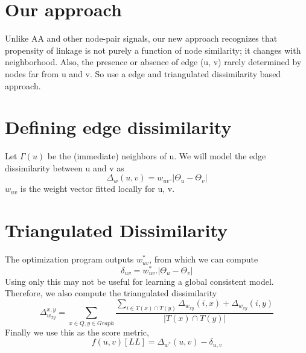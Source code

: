 \section*{Our approach}
Unlike AA and other node-pair signals, our new approach recognizes that propensity of linkage is not purely a function of node similarity; it changes with neighborhood. Also, the presence or absence of edge (u, v) rarely determined by nodes far from u and v. So use a edge and triangulated dissimilarity based approach.


\section*{Defining edge dissimilarity}
Let $\Gamma(u)$ be the (immediate) neighbors of u. We will model the edge dissimilarity between u and v as
\begin{equation}
\Delta_{w}(u,v) = w_{uv} . |\Theta_u - \Theta_v|
\end{equation}
 $w_{uv}$ is the weight vector fitted locally for u, v. 
 
\section*{Triangulated Dissimilarity}
The optimization program outputs $w_{uv}^{\ast}$, from which we can compute 
\begin{equation}
\delta_{uv} = w_{uv}^{\ast} . |\Theta_u - \Theta_v|
\end{equation}
Using only this may not be useful for learning a global consistent model. Therefore, we also compute the triangulated dissimilarity
\begin{equation}
\Delta_{w_{xy}}^{x,y} = \sum_{x \in Q,y \in Graph} \frac{\sum_{i \in T(x) \cap T(y)} \Delta_{w_{xy}}(i,x) + \Delta_{w_{xy}}(i,y)}{ |T(x) \cap T(y)|}
\end{equation}
Finally we use this as the score metric,
\begin{equation}
f(u,v)[LL] = \Delta_{w^{*}}(u,v) - \delta_{u,v}
\end{equation}


